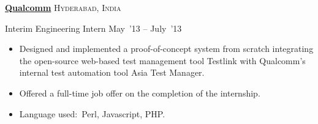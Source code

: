 \documentclass[10pt,a4paper]{article}
\begin{document}
\headedsection  %
  {\href{}{\textbf{Qualcomm}}}
  {\textsc{Hyderabad, India}}
  {%
  \headedsubsection
    {Interim Engineering Intern}
    {May~'13 -- July~'13}
    {\bodytext
    {
    \begin{itemize}
    \item Designed and implemented a proof-of-concept system from scratch integrating the open-source web-based test management tool Testlink with Qualcomm's internal test automation tool Asia Test Manager.
    \item Offered a full-time job offer on the completion of the internship.
    \item Language used:~Perl, Javascript, PHP.
    \end{itemize}}
    }
   
}


\spacedhrule{0.5em}{-0.4em}
\end{document}
